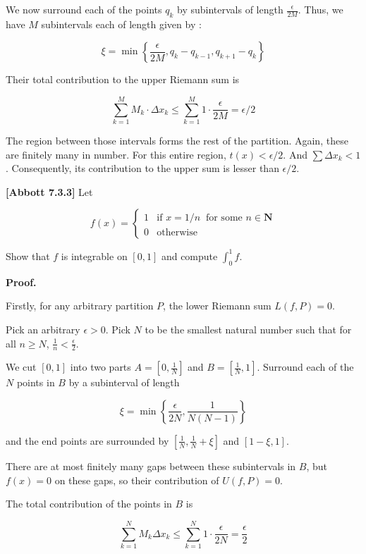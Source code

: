 \documentclass[10pt]{article}
\begin{document}
We now surround each of the points $q_k$ by subintervals of length $\frac{\epsilon}{2M}$. Thus, we have $M$ subintervals each of length given by : 

$$\xi = \min \left\{ \frac{\epsilon}{2M}, q_{k} - q_{k-1}, q_{k+1} - q_{k}\right\}$$

Their total contribution to the upper Riemann sum is 

$$\sum_{k=1}^{M}M_k \cdot \Delta x_k \leq \sum_{k=1}^{M}1\cdot \frac{\epsilon}{2M} = \epsilon/2$$

The region between those intervals forms the rest of the partition. Again, these are finitely many in number. For this entire region, $t(x) < \epsilon/2$. And $\sum \Delta x_k < 1$. Consequently, its contribution to the upper sum is lesser than $\epsilon/2$.

\textbf{[Abbott 7.3.3]} Let


\begin{equation*}
f( x) =\begin{cases}
1 & \text{if } x=1/n\ \text{ for some } n\in \mathbf{N}\\
0 & \text{otherwise}
\end{cases}
\end{equation*}


Show that $\displaystyle f$ is integrable on $\displaystyle [0,1]$ and compute $\displaystyle \int _{0}^{1} f$.



\textbf{Proof.}

Firstly, for any arbitrary partition $P$, the lower Riemann sum $L(f,P) = 0$. 

Pick an arbitrary $\epsilon >0$. Pick $N$ to be the smallest natural number such that for all $n \geq N$, $\frac{1}{n} < \frac{\epsilon}{2}$.

We cut $[0,1]$ into two parts $A=[0,\frac{1}{N}]$ and $B=[\frac{1}{N},1]$. Surround each of the $N$ points in $B$ by a subinterval of length

$$\xi = \min \left\{\frac{\epsilon}{2N},\frac{1}{N(N-1)}\right\}$$

and the end points are surrounded by $[\frac{1}{N},\frac{1}{N} + \xi]$ and $[1 - \xi,1]$.

There are at most finitely many gaps between these subintervals in $B$, but $f(x) = 0$ on these gaps, so their contribution of $U(f,P) = 0$.

The total contribution of the points in $B$ is 

$$\sum_{k=1}^{N}M_k \Delta x_k \leq \sum_{k=1}^{N} 1 \cdot \frac{\epsilon}{2N} = \frac{\epsilon}{2}$$
\end{document}
